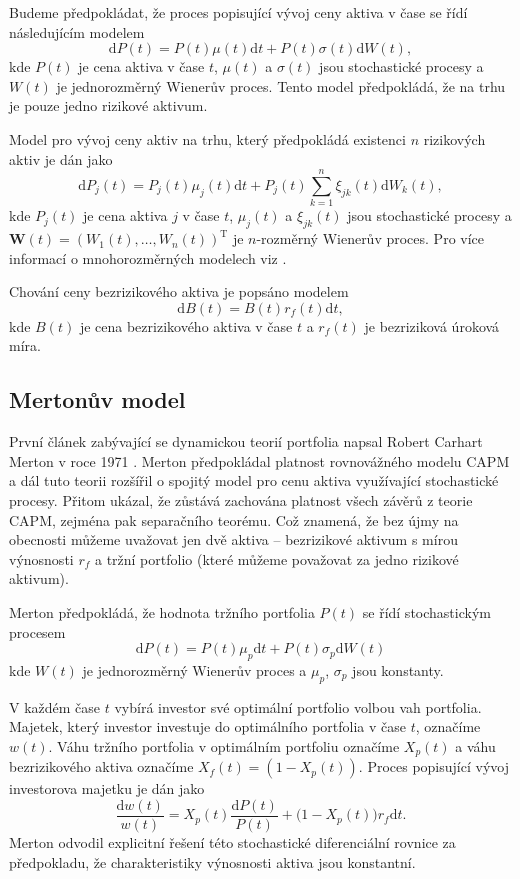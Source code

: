 \documentclass[a4paper,12pt]{report}
\theoremstyle{definition} \newtheorem{definice}[veta]{Definice}
\theoremstyle{remark}
\begin{document}
Budeme předpokládat, že proces popisující vývoj ceny aktiva v čase se řídí následujícím modelem
$$\mathrm{d}P(t)=P(t)\mu(t)\mathrm{d}t+P(t)\sigma(t)\mathrm{d}W(t),$$
kde $P(t)$ je cena aktiva v čase $t$, $\mu(t)$ a $\sigma(t)$ jsou stochastické procesy a $W(t)$  je jednorozměrný Wienerův proces.
Tento model předpokládá, že na trhu je pouze jedno rizikové aktivum.

Model pro vývoj ceny aktiv na trhu, který předpokládá existenci $n$ rizikových aktiv je dán jako
$$\mathrm{d}P_j(t)=P_j(t)\mu_j(t)\mathrm{d}t+P_j(t)\sum_{k=1}^{n}\xi_{jk}(t)\mathrm{d}W_k(t),$$
kde $P_j(t)$ je cena aktiva $j$ v čase $t$, $\mu_j(t)$ a $\xi_{jk}(t)$ jsou stochastické procesy a $\boldsymbol{W}(t)=(W_1(t),\dots,W_n(t))^\mathrm{T}$ je $n$-rozměrný Wienerův proces. 
Pro více informací o mnohorozměrných modelech viz \cite{etheridge2002course}.

Chování ceny bezrizikového aktiva je popsáno modelem
$$\mathrm{d}B(t)=B(t)r_f(t)\mathrm{d}t,$$
kde $B(t)$ je cena bezrizikového aktiva v čase $t$ a $r_f(t)$ je bezriziková úroková míra.


\subsection{Mertonův model}
První článek zabývající se dynamickou teorií portfolia napsal Robert Carhart Merton v roce 1971 \cite{merton1971}.
Merton předpokládal platnost rovnovážného modelu CAPM a dál tuto teorii rozšířil o spojitý model pro cenu aktiva využívající stochastické procesy.
Přitom ukázal, že zůstává zachována platnost všech závěrů z teorie CAPM, zejména pak separačního teorému.
Což znamená, že bez újmy na obecnosti můžeme uvažovat jen dvě aktiva -- bezrizikové aktivum s mírou výnosnosti $r_f$ a tržní portfolio (které můžeme považovat za jedno rizikové aktivum). 

Merton předpokládá, že hodnota tržního portfolia $P(t)$ se řídí stochastickým procesem
$$\mathrm{d}P(t)=P(t)\mu_p\mathrm{d}t+P(t)\sigma_p\mathrm{d}W(t)$$
kde $W(t)$ je jednorozměrný Wienerův proces a $\mu_p$, $\sigma_p$ jsou konstanty. 

V každém čase $t$ vybírá investor své optimální portfolio volbou vah portfolia.
Majetek, který investor investuje do optimálního portfolia v čase $t$, označíme $w(t)$.
Váhu tržního portfolia v optimálním portfoliu označíme $X_p(t)$ a váhu bezrizikového aktiva označíme $X_f(t)=(1-X_p(t))$. 
Proces popisující vývoj investorova majetku je dán jako
$$\frac{\mathrm{d}w(t)}{w(t)}=X_p(t)\frac{\mathrm{d}P(t)}{P(t)}+\big(1-X_p(t)\big)r_f\mathrm{d}t.$$
Merton odvodil explicitní řešení této stochastické diferenciální rovnice za předpokladu, že charakteristiky výnosnosti aktiva jsou konstantní.
\end{document}
